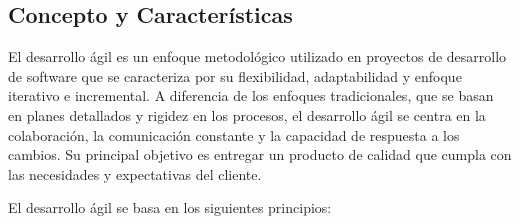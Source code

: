 \subsection{Concepto y Características}

El desarrollo ágil es un enfoque metodológico utilizado en proyectos de desarrollo de software que se caracteriza por su flexibilidad, adaptabilidad y enfoque iterativo e incremental. A diferencia de los enfoques tradicionales, que se basan en planes detallados y rigidez en los procesos, el desarrollo ágil se centra en la colaboración, la comunicación constante y la capacidad de respuesta a los cambios. Su principal objetivo es entregar un producto de calidad que cumpla con las necesidades y expectativas del cliente.

El desarrollo ágil se basa en los siguientes principios:

